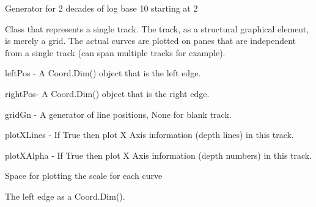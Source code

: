 \documentclass[letterpaper,10pt,english]{sphinxmanual}
\begin{document}
\begin{fulllineitems}
\label{\detokenize{ref/util/plot/Track:TotalDepth.util.plot.Track.genLog10Decade2Start2}}
Generator for 2 decades of log base 10 starting at 2

\end{fulllineitems}


\begin{fulllineitems}
\label{\detokenize{ref/util/plot/Track:TotalDepth.util.plot.Track.Track}}
Class that represents a single track. The track, as a structural
graphical element, is merely a grid.
The actual curves are plotted on panes that are independent from
a single track (can span multiple tracks for example).

leftPos - A Coord.Dim() object that is the left edge.

rightPos- A Coord.Dim() object that is the right edge.

gridGn - A generator of line positions, None for blank track.

plotXLines - If True then plot X Axis information (depth lines) in this track.

plotXAlpha - If True then plot X Axis information (depth numbers) in this track.

\begin{fulllineitems}
\label{\detokenize{ref/util/plot/Track:TotalDepth.util.plot.Track.Track.DEPTH_PER_CH}}
Space for plotting the scale for each curve

\end{fulllineitems}


\begin{fulllineitems}
\label{\detokenize{ref/util/plot/Track:TotalDepth.util.plot.Track.Track.left}}
The left edge as a Coord.Dim().


\end{fulllineitems}
\end{fulllineitems}
\end{document}

